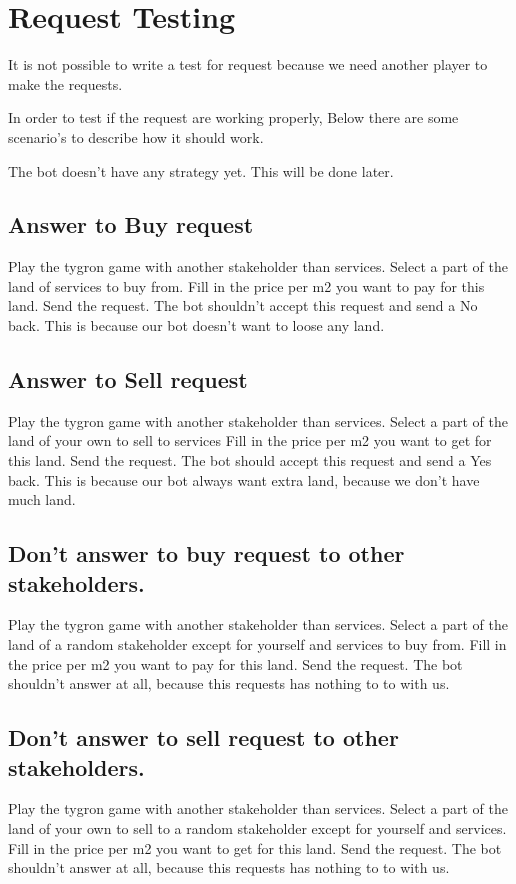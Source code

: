 \documentclass[]{article}
\begin{document}
	
\section{Request Testing}
It is not possible to write a test for request because we need another player to make the requests.

In order to test if the request are working properly, Below there  are some scenario's to describe how it should work.

The bot doesn't have any strategy yet. This will be done later.

\subsection{Answer to Buy request}
Play the tygron game with another stakeholder than services.
Select a part of the land of services to buy from.
Fill in the price per m2 you want to pay for this land.
Send the request.
The bot shouldn't accept this request and send a No back. This is because our bot doesn't want to loose any land.


\subsection{Answer to Sell request}
Play the tygron game with another stakeholder than services.
Select a part of the land of your own to sell to services
Fill in the price per m2 you want to get for this land.
Send the request.
The bot should accept this request and send a Yes back. This is because our bot always want extra land, because we don't have much land.

\subsection{Don't answer to buy request to other stakeholders.}
Play the tygron game with another stakeholder than services.
Select a part of the land of a random stakeholder except for yourself and services to buy from.
Fill in the price per m2 you want to pay for this land.
Send the request.
The bot shouldn't answer at all, because this requests has nothing to to with us. 

\subsection{Don't answer to sell request to other stakeholders.}
Play the tygron game with another stakeholder than services.
Select a part of the land of your own to sell to a random stakeholder except for yourself and services.
Fill in the price per m2 you want to get for this land.
Send the request.
The bot shouldn't answer at all, because this requests has nothing to to with us. 
\end{document}
